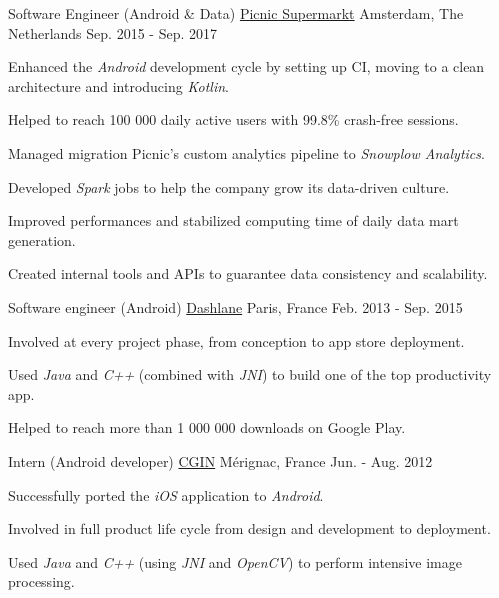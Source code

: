 
	\begin{cventries}
	
		\cventry
			{Software Engineer (Android \& Data)}
			{\href{https://www.picnic.nl}{Picnic Supermarkt}}
			{Amsterdam, The Netherlands}
			{Sep. 2015 - Sep. 2017}
			{
				\begin{cvitems}
					\item Enhanced the \textit{Android} development cycle by setting up CI, moving to a clean architecture and introducing \textit{Kotlin}.
					\item Helped to reach 100 000 daily active users with 99.8\% crash-free sessions.
					\item Managed migration Picnic's custom analytics pipeline to \textit{Snowplow Analytics}.
					\item Developed \textit{Spark} jobs to help the company grow its data-driven culture.
					\item Improved performances and stabilized computing time of daily data mart generation.
					\item Created internal tools and APIs to guarantee data consistency and scalability.
				\end{cvitems}
			}
		
		\cventry
			{Software engineer (Android)}
			{\href{https://www.dashlane.com}{Dashlane}}
			{Paris, France}
			{Feb. 2013 - Sep. 2015}
			{
				\begin{cvitems}
					\item Involved at every project phase, from conception to app store deployment.
					\item Used \textit{Java} and \textit{C++} (combined with \textit{JNI}) to build one of the top productivity app.
					\item Helped to reach more than 1 000 000 downloads on Google Play.
				\end{cvitems}
			}
		
		\cventry
			{Intern (Android developer)}
			{\href{https://www.photoservice.com}{CGIN}}
			{Mérignac, France}
			{Jun. - Aug. 2012}
			{
				\begin{cvitems}
					\item Successfully ported the \textit{iOS} application to \textit{Android}.
					\item Involved in full product life cycle from design and development to deployment.
					\item Used \textit{Java} and \textit{C++} (using \textit{JNI} and \textit{OpenCV}) to perform intensive image processing.
				\end{cvitems}
			}
		

\end{cventries}
